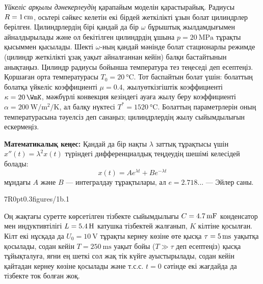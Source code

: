\problemsheader



\textit{Үйкеліс арқылы дәнекерлеудің} қарапайым моделін қарастырайық. Радиусы $R=\qty1{\cm}$, осьтері сәйкес келетін екі бірдей жеткілікті ұзын болат цилиндрлер берілген. Цилиндрлердің бірі қандай да бір $\omega$ бұрыштық жылдамдығымен айналдырылады және ол бекітілген цилиндрдің ұшына $p=\qty{20}{\MPa}$ тұрақты қысыммен қысылады. Шекті $\omega$-ның қандай мәнінде болат стационарлы режимде (цилиндр жеткілікті ұзақ уақыт айналғаннан кейін) балқи бастайтынын анықтаңыз. Цилиндр радиусы бойынша температура тез теңеседі деп есептеңіз. Қоршаған орта температурасы $T_0=\qty{20}{\celsius}$. Тот баспайтын болат үшін: болаттың болатқа үйкеліс коэффициенті $\mu=0.4$, жылуөткізгіштік коэффициенті $\kappa=\qty{20}{\WmK}$, мәжбүрлі конвекция кезіндегі ауаға жылу беру коэффициенті $\alpha=\qty{200}{\W\per\metre\squared\per\kelvin}$, ал балқу нүктесі $T^*=\qty{1520}{\celsius}$. Болаттың параметрлерін оның температурасына тәуелсіз деп санаңыз; цилиндрлердің жылу сыйымдылығын ескермеңіз.

\textbf{Математикалық кеңес:} Қандай да бір нақты $\lambda$ заттық тұрақтысы үшін $x''(t) = \lambda^2 x(t)$ түріндегі дифференциалдық теңдеудің шешімі келесідей болады:
$$
x(t) = Ae^{\lambda t} + Be^{-\lambda t}
$$
мұндағы $A$ және $B$ --- интегралдау тұрақтылары, ал $e=2.718...$ --- Эйлер саны.


\pic7R{0pt}{0.3}{figures/1b.1}

Оң жақтағы суретте көрсетілген тізбекте сыйымдылығы $C=\qty{4.7}{\mF}$ конденсатор мен индуктивтілігі $L=\qty{5.4}{\H}$ катушка тізбектей жалғанып, $K$ кілтіне қосылған. Кілт екі нұсқада да $U_0=\qty{10}{\V}$ тұрақты кернеу көзіне өте қысқа $\tau=\qty5{\ms}$ уақытқа қосылады, содан кейін $T=\qty{250}{\ms}$ уақыт бойы ($T\gg\tau$ деп есептеңіз) қысқа тұйықталуға, яғни ең шеткі сол жақ тік күйге ауыстырылады, содан кейін қайтадан кернеу көзіне қосылады және т.с.с. $t=0$ сәтінде екі жағдайда да тізбекте ток болған жоқ.

